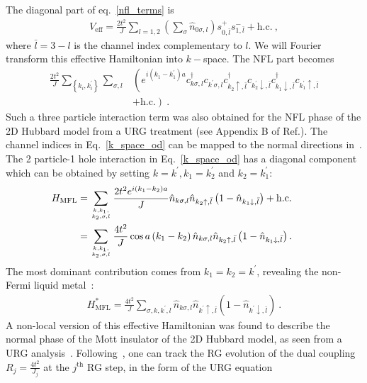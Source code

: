 \documentclass{iopart}
\begin{document}
The diagonal part of eq.~\ref{nfl_terms} is
\begin{eqnarray}
	V_\mathrm{eff} = \frac{2t^2}{J}\sum_{l=1,2}\left(\sum_\sigma \hat n_{0\sigma,l}\right) s^+_{0,\bar l}s^-_{1,\bar l} + \mathrm{h.c.}~,
\end{eqnarray}
where \(\bar l = 3 - l\) is the channel index complementary to \(l\). We will Fourier transform this effective Hamiltonian into \(k-\)space. The NFL part becomes
\begin{eqnarray}
	\label{k_space_od}
	\frac{2t^2}{J}\sum_{\left\{k_i,k_i^\prime\right\}}\sum_{\sigma, l} &\left(e^{i\left(k_1 - k_1^\prime\right)a}c^\dagger_{k\sigma,l}c_{k^\prime\sigma,l}c^\dagger_{k_2 \uparrow, \bar l}c_{k_2^\prime \downarrow,\bar l}c^\dagger_{k_1 \downarrow,\bar l}c_{k_1^\prime \uparrow, \bar l}\right.\nonumber\\
									   &\left. + \mathrm{h.c.}\right) ~.\qquad
\end{eqnarray}
Such a three particle interaction term was also obtained for the NFL phase of the 2D Hubbard model from a URG treatment (see Appendix B of Ref.\cite{anirbanmott1}). The channel indices in Eq.~\ref{k_space_od} can be mapped to the normal directions in~\cite{anirbanmott1}. The 2 particle-1 hole interaction in Eq.~\ref{k_space_od} has a diagonal component which can be obtained by setting \(k=k^\prime, k_1 = k_2^\prime\) and \(k_2 = k_1^\prime\):
\begin{eqnarray}
	H_\mathrm{MFL} &= \sum_{k, k_1, \atop{k_2,\sigma,  l}} \frac{2t^2e^{i\left(k_1 - k_2\right)a}}{J} \hat n_{k\sigma,l} \hat n_{k_2 \uparrow, \bar l}\left(1 - \hat n_{k_1 \downarrow,\bar l}\right) + \mathrm{h.c.}\nonumber\\
	&= \sum_{k, k_1, \atop{k_2,\sigma,  l}} \frac{4t^2}{J} \cos a\left(k_1 - k_2\right)  \hat n_{k\sigma,l} \hat n_{k_2 \uparrow, \bar l}\left(1 - \hat n_{k_1 \downarrow,\bar l}\right).\qquad 
\end{eqnarray}
The most dominant contribution comes from \(k_1 = k_2 = k^\prime\), revealing the non-Fermi liquid metal~\cite{cox_jarrell_two_channel_rev,andrei_jerez_1995}:
\begin{eqnarray}
	\label{mfl_large}
	H^*_\mathrm{MFL} = \frac{4t^2}{J} \sum_{\sigma, k, k^\prime, l} \hat n_{k\sigma,l} \hat n_{k^\prime \uparrow, \bar l}\left(1 - \hat n_{k^\prime \downarrow,\bar l}\right)~.
\end{eqnarray}
A non-local version of this effective Hamiltonian was found to describe the normal phase of the Mott insulator of the 2D Hubbard model, as seen from a URG analysis~\cite{anirbanmott1,anirbanmott2}. Following~\cite{anirbanmott1}, one can track the RG evolution of the dual coupling \(R_j = \frac{4t^2}{J_j}\) at the \(j^\mathrm{th}\) RG step, in the form of the URG equation
\end{document}
